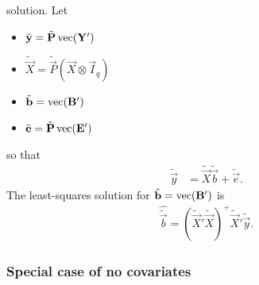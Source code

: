 solution.
Let
\begin{itemize}
  \item $\tilde{\mathbf{y}} = \tilde{\mathbf{P}} \operatorname{vec}(\mathbf{Y}')$
  \item $\tilde{\vec X} = \tilde{\vec P} (\vec X \otimes \vec I_q)$
  \item $\tilde{\mathbf{b}} = \operatorname{vec}(\mathbf{B}')$
  \item $\tilde{\mathbf{e}} = \tilde{\mathbf{P}} \operatorname{vec}(\mathbf{E}')$
\end{itemize}
so that
\begin{align} 
  \label{}
  \tilde{\vec y} &= \tilde{\vec X} \tilde{\vec b} + \tilde{\vec e}.
\end{align}
The least-squares solution for $\tilde{\mathbf{b}} = \operatorname{vec} (\mathbf{B}')$ is
\begin{align}
  \label{eq:b-tilde-hat}
  \hat{\tilde{\vec b}}
  = (\tilde{\vec X}' \tilde{\vec X})^{+} \tilde{\vec X}' \tilde{\vec y}.
\end{align}

\subsubsection{Special case of no covariates}

